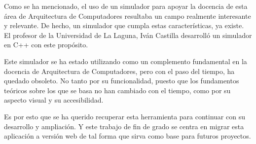 Como se ha mencionado, el uso de un simulador para apoyar la docencia de esta área
de Arquitectura de Computadores resultaba un campo realmente interesante y relevante. 
De hecho, un simulador que cumpla estas características, ya existe. El profesor 
de la Universidad de La Laguna, Iván Castilla desarrolló un simulador en C++ con este propósito.

\bigskip
Este simulador se ha estado utilizando como un complemento fundamental en la docencia
de Arquitectura de Computadores, pero con el paso del tiempo, ha quedado obsoleto. 
No tanto por su funcionalidad, puesto que los fundamentos teóricos sobre los que 
se basa no han cambiado con el tiempo, como por su aspecto visual y su accesibilidad.

\bigskip
Es por esto que se ha querido recuperar esta herramienta para continuar con su desarrollo 
y ampliación. Y este trabajo de fin de grado se centra en migrar esta aplicación a versión 
web de tal forma que sirva como base para futuros proyectos.